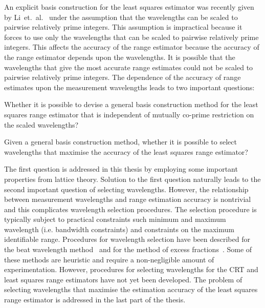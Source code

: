 An explicit basis construction for the least squares estimator was recently given by Li~et.~al.~\cite{Li_distance_est_wrapped_phase} under the assumption that the wavelengths can be scaled to pairwise relatively prime integers. This assumption is impractical because it forces to use only the wavelengths that can be scaled to pairwise relatively prime integers. %
This affects the accuracy of the range estimator because the accuracy of the range estimator depends upon the wavelengths. It is possible that the wavelengths that give the most accurate range estimates could not be scaled to pairwise relatively prime integers. The dependence of the accuracy of range estimates upon the measurement wavelengths leads to two important questions:
\begin{itemise}
\item{Whether it is possible to devise a general basis construction method for the least squares range estimator that is independent of mutually co-prime restriction on the scaled wavelengths?}
\item{Given a general basis construction method, whether it is possible to select wavelengths that maximise the accuracy of the least squares range estimator?}
\end{itemise}
The first question is addressed in this thesis by employing some important properties from lattice theory. Solution to the first question naturally leads to the second important question of selecting wavelengths.
However, the relationship between measurement wavelengths and range estimation accuracy is nontrivial and this complicates wavelength selection procedures. The selection procedure is typically subject to practical constraints such minimum and maximum wavelength (i.e. bandwidth constraints) and constraints on the maximum identifiable range. Procedures for wavelength selection have been described for the beat wavelength method~\cite{Towers_frequency_selection_interferometry_2003} and for the method of excess fractions~\cite{Falaggis_excess_fractions_2012}.  Some of these methods are heuristic and require a non-negligible amount of experimentation.  However, procedures for selecting wavelengths for the CRT and least squares range estimators have not yet been developed. The problem of selecting wavelengths that maximise the estimation accuracy of the least squares range estimator is addressed in the last part of the thesis.


